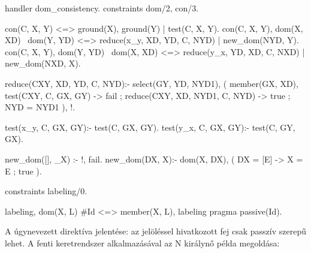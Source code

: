 \begin{prologcode}
handler dom_consistency.
constraints dom/2, con/3.

con(C, X, Y) <=> ground(X), ground(Y) | test(C, X, Y).
con(C, X, Y), dom(X, XD) \ dom(Y, YD) <=> 
        reduce(x_y, XD, YD, C, NYD) | new_dom(NYD, Y).
con(C, X, Y), dom(Y, YD) \ dom(X, XD) <=> 
        reduce(y_x, YD, XD, C, NXD) | new_dom(NXD, X).

  reduce(CXY, XD, YD, C, NYD):- 
        select(GY, YD, NYD1), %
        (   member(GX, XD), test(CXY, C, GX, GY) -> fail
        ;   reduce(CXY, XD, NYD1, C, NYD) -> true
        ;   NYD = NYD1
        ), !.

  test(x_y, C, GX, GY):- test(C, GX, GY).
  test(y_x, C, GX, GY):- test(C, GY, GX).

  new_dom([], _X) :- !, fail.
  new_dom(DX, X):- dom(X, DX),
          (   DX = [E] -> X = E
          ;   true
          ).

constraints labeling/0.

labeling, dom(X, L) #Id <=> member(X, L), labeling
        pragma passive(Id).
\end{prologcode}

A  úgynevezett  direktíva jelentése: az 
jelöléssel hivatkozott fej csak passzív szerepű lehet. A fenti keretrendszer
alkalmazásával az N királynő példa megoldása:

